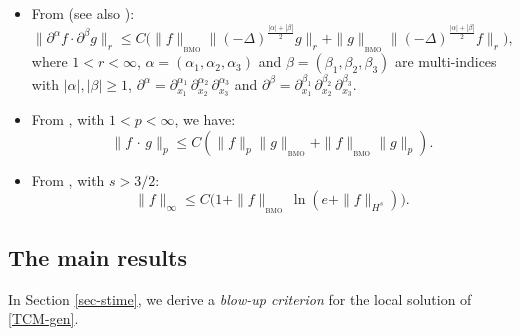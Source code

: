 \documentclass[a4paper]{article}
\newcommand{\D}{\partial}
\begin{document}
\begin{itemize}
  \item   From  \cite{Kozono2000} (see also
  \cite{Zhang-Xu}): 
%
  \begin{equation} \label{Kozono-BMO} \| \D^\alpha f\cdot \D^\beta
    g\|_r \leq C \big(\|f\|_{{}_{\textrm{BMO}}}\|
    (-\Delta)^{\frac{|\alpha|+|\beta|}{2}}g\|_r + \|g\|_{{}_{\textrm{BMO}}} \|
    (-\Delta)^{\frac{|\alpha|+|\beta|}{2}}f\|_r\big),
  \end{equation}
  where $1 < r < \infty$, $\alpha = (\alpha_1, \alpha_2,\alpha_3)$ and
  $\beta = (\beta_1, \beta_2, \beta_3)$ are multi-indices with
  $|\alpha|, |\beta| \geq 1$,
  $\D^\alpha ={\partial_{x_1}^{\alpha_1}\, \partial_{x_2}^{\alpha_2}\,
    \partial_{x_3}^{\alpha_3}}$ and
  $\D^\beta ={\partial_{x_1}^{\beta_1}\, \partial_{x_2}^{\beta_2}\,
    \partial_{x_3}^{\beta_3}}$.
    
\item From \cite{Kozono2000}, with $1<p<\infty$, we have:
      \begin{equation} \label{BMO} \|f \,\cdot\, g\|_p \leq
    C(\|f\|_p\|g\|_{_{\textrm{BMO}}} + \|f\|_{_{\textrm{BMO}}}\|g\|_p).
  \end{equation}
  
  \item  From \cite[(1.11)]{Kozono2002}, with $s>3/2$:
  \begin{equation}
    \label{e:kozono2002}
    \|f\|_{\infty}\le C\big(1+\|f\|_{_{\textrm{BMO}}}\, \ln (e+ \|f\|_{H^s})\big).
  \end{equation}
  \end{itemize}

  \subsection{The main results} \label{subsec:reg-result}
  
  In Section \ref{sec-stime}, we derive a \emph{blow-up criterion} for the local solution of \eqref{TCM-gen}. 
  
\end{document}
